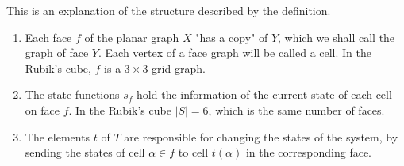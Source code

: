 \documentclass[]{article}
\theoremstyle{definition}
\theoremstyle{definition}
\begin{document}
This is an explanation of the structure described by the definition.

\begin{enumerate}
	\item Each face $f$ of the planar graph $X$ "has a copy" of $Y$, which we shall call the graph of face $Y$. Each vertex of a face graph will be called a cell. In the Rubik's cube, $f$ is a $3\times 3$ grid graph.
	
	\item The state functions $s_f$ hold the information of the current state of each cell on face $f$. In the Rubik's cube $|S| = 6$, which is the same number of faces. 
	
	\item The elements $t$ of $T$ are responsible for changing the states of the system, by sending the states of cell $\alpha \in f$ to cell $t(\alpha)$ in the corresponding face.  
\end{enumerate}
\end{document}
